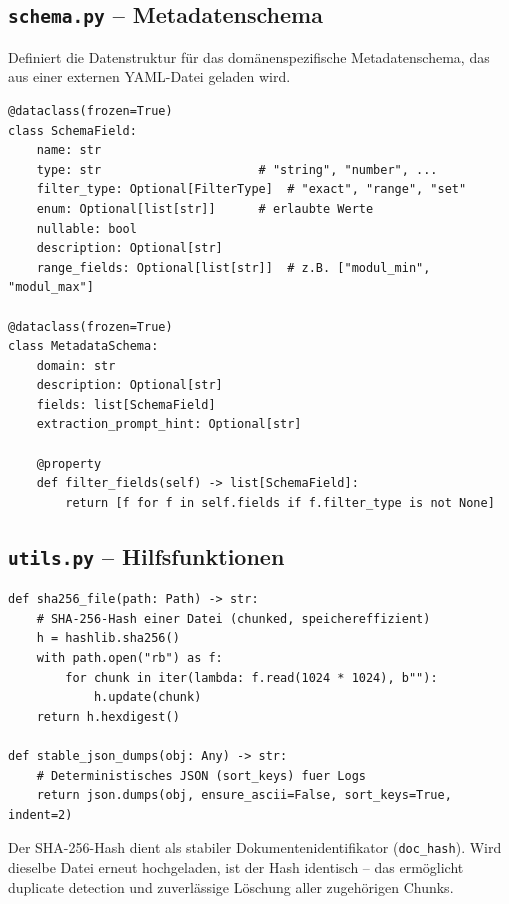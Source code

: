 \documentclass[12pt, a4paper]{article}
\begin{document}
\subsection{\texttt{schema.py} -- Metadatenschema}

Definiert die Datenstruktur für das domänenspezifische Metadatenschema, das aus einer
externen YAML-Datei geladen wird.

\begin{lstlisting}[style=pythonstyle, caption={Schema-Datenstrukturen (schema.py)}]
@dataclass(frozen=True)
class SchemaField:
    name: str
    type: str                      # "string", "number", ...
    filter_type: Optional[FilterType]  # "exact", "range", "set"
    enum: Optional[list[str]]      # erlaubte Werte
    nullable: bool
    description: Optional[str]
    range_fields: Optional[list[str]]  # z.B. ["modul_min", "modul_max"]

@dataclass(frozen=True)
class MetadataSchema:
    domain: str
    description: Optional[str]
    fields: list[SchemaField]
    extraction_prompt_hint: Optional[str]

    @property
    def filter_fields(self) -> list[SchemaField]:
        return [f for f in self.fields if f.filter_type is not None]
\end{lstlisting}

\subsection{\texttt{utils.py} -- Hilfsfunktionen}

\begin{lstlisting}[style=pythonstyle, caption={Hilfsfunktionen (utils.py)}]
def sha256_file(path: Path) -> str:
    # SHA-256-Hash einer Datei (chunked, speichereffizient)
    h = hashlib.sha256()
    with path.open("rb") as f:
        for chunk in iter(lambda: f.read(1024 * 1024), b""):
            h.update(chunk)
    return h.hexdigest()

def stable_json_dumps(obj: Any) -> str:
    # Deterministisches JSON (sort_keys) fuer Logs
    return json.dumps(obj, ensure_ascii=False, sort_keys=True, indent=2)
\end{lstlisting}

Der SHA-256-Hash dient als stabiler Dokumentenidentifikator (\texttt{doc\_hash}).
Wird dieselbe Datei erneut hochgeladen, ist der Hash identisch -- das ermöglicht
duplicate detection und zuverlässige Löschung aller zugehörigen Chunks.
\end{document}
